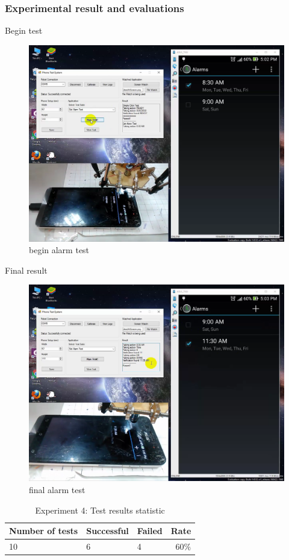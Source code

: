 \subsubsection{Experimental result and evaluations}
Begin test
	\begin{figure}[H]
		\centering
		\includegraphics[width=\maxwidth{15cm}, keepaspectratio]{Chapters/Fig/alarm_start.png}
		\caption{begin alarm test}
		\label{fig:alarm_start}
	\end{figure}

Final result
	\begin{figure}[H]
		\centering
		\includegraphics[width=\maxwidth{15cm}, keepaspectratio]{Chapters/Fig/alarm_final.png}
		\caption{final alarm test}
		\label{fig:alarm_final}
	\end{figure}
\begin{table}[H]
	\centering
	\caption{Experiment 4: Test results statistic}	
	\label{tab:result_stat}
	\begin{tabular}{|lll|r|}
		\hline
		\textbf{Number of tests} & \textbf{Successful} & \textbf{Failed} & \textbf{Rate} \\
		\hline
		10 & 6 & 4 & 60$\%$\\
		\hline
	\end{tabular}
\end{table}



